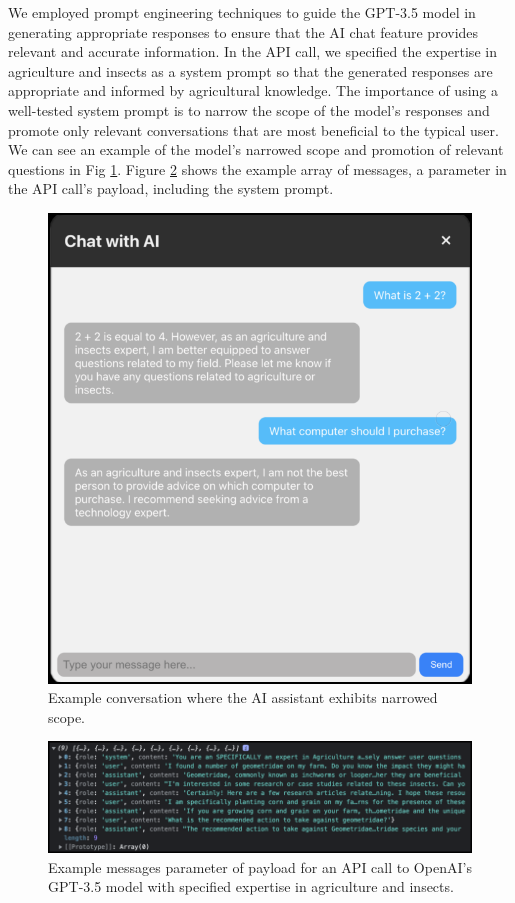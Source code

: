 We employed prompt engineering techniques to guide the GPT-3.5 model in generating appropriate responses to ensure that the AI chat feature provides relevant and accurate information. In the API call, we specified the expertise in agriculture and insects as a system prompt so that the generated responses are appropriate and informed by agricultural knowledge. The importance of using a well-tested system prompt is to narrow the scope of the model's responses and promote only relevant conversations that are most beneficial to the typical user. We can see an example of the model's narrowed scope and promotion of relevant questions in Fig \ref{fig:4.9}. Figure \ref{fig:4.10} shows the example array of messages, a parameter in the API call's payload, including the system prompt.

\begin{figure}[H]
\begin{center}
\includegraphics[width=0.8\linewidth]{Honors_Thesis/Figures/4.9.png}
\end{center}
\caption{Example conversation where the AI assistant exhibits narrowed scope.}
\label{fig:4.9}
\end{figure}

\begin{figure}[H]
\begin{center}
\includegraphics[width=1.0\linewidth]{Honors_Thesis/Figures/4.10.png}
\end{center}
\caption{Example messages parameter of payload for an API call to OpenAI's GPT-3.5 model with specified expertise in agriculture and insects.}
\label{fig:4.10}
\end{figure}

